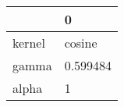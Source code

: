 \begin{tabular}{ll}
\toprule
{} &         0 \\
\midrule
kernel &    cosine \\
gamma  &  0.599484 \\
alpha  &         1 \\
\bottomrule
\end{tabular}
